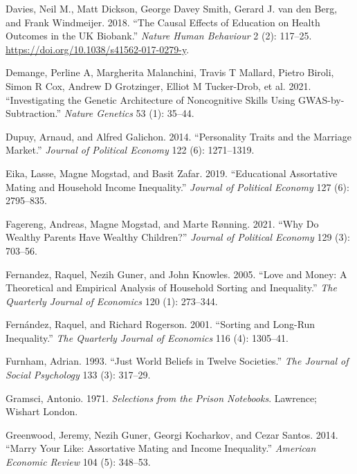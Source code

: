 \documentclass[
]{article}
\newlength{\cslhangindent}
\newlength{\cslentryspacingunit} %
\newenvironment{CSLReferences}[2] %
 {%
  \setlength{\parindent}{0pt}
  \ifodd #1
  \let\oldpar\par
  \def\par{\hangindent=\cslhangindent\oldpar}
  \fi
  \setlength{\parskip}{#2\cslentryspacingunit}
 }%
 {}
\theoremstyle{definition}
\theoremstyle{definition}
\theoremstyle{definition}
\theoremstyle{definition}
\theoremstyle{remark}
\begin{document}
\begin{CSLReferences}{1}{0}
\leavevmode{}%
Davies, Neil M., Matt Dickson, George Davey Smith, Gerard J. van den Berg, and Frank Windmeijer. 2018. {``The Causal Effects of Education on Health Outcomes in the {UK} Biobank.''} \emph{Nature Human Behaviour} 2 (2): 117--25. \url{https://doi.org/10.1038/s41562-017-0279-y}.

\leavevmode{}%
Demange, Perline A, Margherita Malanchini, Travis T Mallard, Pietro Biroli, Simon R Cox, Andrew D Grotzinger, Elliot M Tucker-Drob, et al. 2021. {``Investigating the Genetic Architecture of Noncognitive Skills Using GWAS-by-Subtraction.''} \emph{Nature Genetics} 53 (1): 35--44.

\leavevmode{}%
Dupuy, Arnaud, and Alfred Galichon. 2014. {``Personality Traits and the Marriage Market.''} \emph{Journal of Political Economy} 122 (6): 1271--1319.

\leavevmode{}%
Eika, Lasse, Magne Mogstad, and Basit Zafar. 2019. {``Educational Assortative Mating and Household Income Inequality.''} \emph{Journal of Political Economy} 127 (6): 2795--835.

\leavevmode{}%
Fagereng, Andreas, Magne Mogstad, and Marte Rønning. 2021. {``Why Do Wealthy Parents Have Wealthy Children?''} \emph{Journal of Political Economy} 129 (3): 703--56.

\leavevmode{}%
Fernandez, Raquel, Nezih Guner, and John Knowles. 2005. {``Love and Money: A Theoretical and Empirical Analysis of Household Sorting and Inequality.''} \emph{The Quarterly Journal of Economics} 120 (1): 273--344.

\leavevmode{}%
Fernández, Raquel, and Richard Rogerson. 2001. {``Sorting and Long-Run Inequality.''} \emph{The Quarterly Journal of Economics} 116 (4): 1305--41.

\leavevmode{}%
Furnham, Adrian. 1993. {``Just World Beliefs in Twelve Societies.''} \emph{The Journal of Social Psychology} 133 (3): 317--29.

\leavevmode{}%
Gramsci, Antonio. 1971. \emph{Selections from the Prison Notebooks}. Lawrence; Wishart London.

\leavevmode{}%
Greenwood, Jeremy, Nezih Guner, Georgi Kocharkov, and Cezar Santos. 2014. {``Marry Your Like: Assortative Mating and Income Inequality.''} \emph{American Economic Review} 104 (5): 348--53.


\end{CSLReferences}
\end{document}

